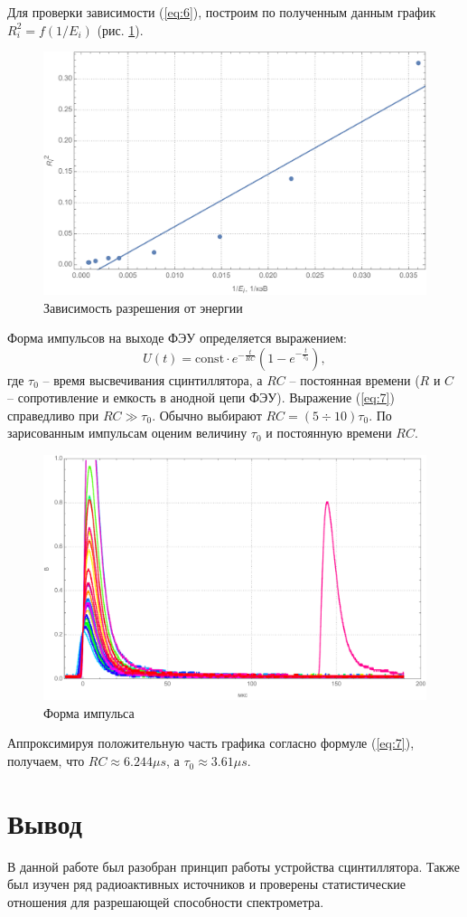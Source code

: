 \documentclass[a4paper, 12pt]{article}
\begin{document}
	 Для проверки зависимости (\ref{eq:6}), построим по полученным данным график $R_i^2=f\left(1/E_i\right)$ (рис. \ref{fig:re}).
	 \begin{figure}[!htb]
	 	\centering
	 	\includegraphics[scale=0.7]{Re.pdf}
	 	\caption{Зависимость разрешения от энергии}
	 	\label{fig:re}
	 \end{figure}
	 \par
	 Форма импульсов на выходе ФЭУ определяется выражением:
	 \begin{equation}
	 U(t)=\text{const}\cdot e^{-\frac{t}{RC}}\left(1-e^{-\frac{t}{\tau_0}}\right),
	 \label{eq:7}
	 \end{equation}
	 где $\tau_0$ -- время высвечивания сцинтиллятора, а $RC$ -- постоянная времени ($R$ и $C$ -- сопротивление и емкость в анодной цепи ФЭУ). Выражение (\ref{eq:7}) справедливо при $RC\gg\tau_0$. Обычно выбирают $RC=(5\div 10)\tau_0$. По зарисованным импульсам оценим величину $\tau_0$ и постоянную времени $RC$.
	 \begin{figure}[!htb]
	 	\centering
	 	\includegraphics[scale=0.7]{oscil.pdf}
	 	\caption{Форма импульса}
	 \end{figure}
	 \par
	 Аппроксимируя положительную часть графика согласно формуле (\ref{eq:7}), получаем, что $RC\approx 6.244 \mu s$, а $\tau_0\approx 3.61 \mu s$.
	 \section{Вывод}
	 В данной работе был разобран принцип работы устройства сцинтиллятора. Также был изучен ряд радиоактивных источников и проверены статистические отношения для разрешающей способности спектрометра.
\end{document}
